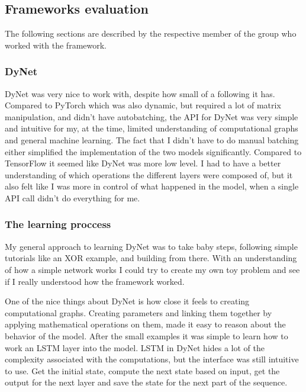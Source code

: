 \subsection{Frameworks evaluation}\label{subsec:frameworks}

The following sections are described by the respective member of the group who
worked with the framework. 

\subsubsection{DyNet}

DyNet was very nice to work with, despite how small of a following it has.
Compared to PyTorch which was also dynamic, but required a lot of matrix
manipulation, and didn't have autobatching, the API for DyNet was very simple
and intuitive for my, at the time, limited understanding of computational graphs
and general machine learning. The fact that I didn't have to do manual batching
either simplified the implementation of the two models significantly. Compared
to TensorFlow it seemed like DyNet was more low level. I had to have a better
understanding of which operations the different layers were composed of, but it
also felt like I was more in control of what happened in the model, when a
single API call didn't do everything for me.

\subsubsection*{The learning proccess}

My general approach to learning DyNet was to take baby steps, following simple
tutorials like an XOR example, and building from there. With an understanding of
how a simple network works I could try to create my own toy problem and see
if I really understood how the framework worked. 

One of the nice things about DyNet is how close it feels to creating
computational graphs. Creating parameters and linking them together by applying
mathematical operations on them, made it easy to reason about the behavior of
the model. After the small examples it was simple to learn how to work an LSTM
layer into the model. LSTM in DyNet hides a lot of the complexity associated
with the computations, but the interface was still intuitive to use. Get the
initial state, compute the next state based on input, get the output for the
next layer and save the state for the next part of the sequence.

